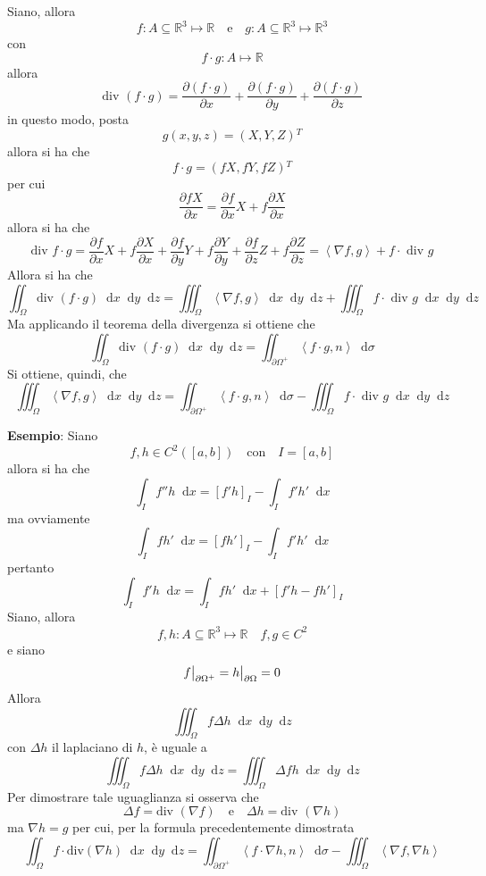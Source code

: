 \documentclass[a4paper]{extarticle}
\newcommand*\dif{\mathop{}\!\mathrm{d}}
\newcommand\restr[2]{{%
  \left.\kern-\nulldelimiterspace %
  #1 %
  \vphantom{\big|} %
  \right|_{#2} %
  }}
\begin{document}
\vspace{2em}
\noindent
Siano, allora
\[f : A \subseteq \mathbb{R}^3 \longmapsto \mathbb{R} \hspace{1em} \text{e} \hspace{1em} g : A \subseteq \mathbb{R}^3 \longmapsto \mathbb{R}^3\]
con
\[f \cdot g : A \longmapsto \mathbb{R}\]
allora
\[\text{div }(f \cdot g) = \dfrac{\partial (f \cdot g)}{\partial x} + \dfrac{\partial (f \cdot g)}{\partial y} + \dfrac{\partial (f \cdot g)}{\partial z}\]
in questo modo, posta
\[g(x,y,z)=\left(X,Y,Z\right){^T}\]
allora si ha che
\[f \cdot g = \left(f X, f Y, f Z\right){^T}\]
per cui
\[\dfrac{\partial f X}{\partial x} = \dfrac{\partial f}{\partial x} X + f \frac{\partial X}{\partial x}\]
allora si ha che
\[\text{div } f \cdot g = \dfrac{\partial f}{\partial x} X + f \frac{\partial X}{\partial x} + \dfrac{\partial f}{\partial y} Y + f \frac{\partial Y}{\partial y} + \dfrac{\partial f}{\partial z} Z + f \frac{\partial Z}{\partial z} = \left<\nabla f,g\right> + f \cdot \text{ div } g\]
Allora si ha che
\[\iint_\Omega \text{div } (f \cdot g) \dif x \dif y \dif z = \iiint_\Omega \left<\nabla f,g\right> \dif x \dif y \dif z + \iiint_\Omega f \cdot \text{ div } g \dif x \dif y \dif z\]
Ma applicando il teorema della divergenza si ottiene che
\[\iint_\Omega \text{div } (f \cdot g) \dif x \dif y \dif z = \iint_{\partial \Omega^+} \left<f \cdot g, n\right> \dif \sigma\]
Si ottiene, quindi, che
\[\iiint_\Omega \left<\nabla f, g\right> \dif x \dif y \dif z = \iint_{\partial \Omega^+} \left<f \cdot g, n\right> \dif \sigma - \iiint_\Omega f \cdot \text{ div } g \dif x \dif y \dif z\]

\vspace{2em}
\noindent
\textbf{Esempio}: Siano
\[f, h \in C^2\left([a,b]\right) \hspace{1em} \text{con} \hspace{1em} I=[a,b]\]
allora si ha che 
\[\int_I f'' h \dif x = \left[f' h\right]_I - \int_I f' h' \dif x\]
ma ovviamente
\[\int_I f h' \dif x = \left[f h'\right]_I - \int_I f' h' \dif x\]
pertanto
\[\int_I f' h \dif x = \int_I f h' \dif x + \left[f' h - f h'\right]_I\]
Siano, allora
\[f,h : A \subseteq \mathbb{R}^3 \longmapsto \mathbb{R} \hspace{1em} f,g \in C^2\]
e siano
\[\restr{f}{\partial \Omega^+} = \restr{h}{\partial \Omega} = 0\]
Allora
\[\iiint_\Omega f \Delta h \dif x \dif y \dif z\]
con $\Delta h$ il laplaciano di $h$, è uguale a
\[\iiint_\Omega f \Delta h \dif x \dif y \dif z = \iiint_\Omega \Delta f h \dif x \dif y \dif z\]
Per dimostrare tale uguaglianza si osserva che 
\[\Delta f = \text{div } (\nabla f) \hspace{1em} \text{e} \hspace{1em} \Delta h = \text{div } (\nabla h)\]
ma $\nabla h = g$ per cui, per la formula precedentemente dimostrata
\[\iint_\Omega f \cdot \text{div}(\nabla h) \dif x \dif y \dif z = \iint_{\partial \Omega^+} \left<f\cdot \nabla h, n\right> \dif \sigma - \iiint_\Omega \left<\nabla f, \nabla h\right>\]
\end{document}
